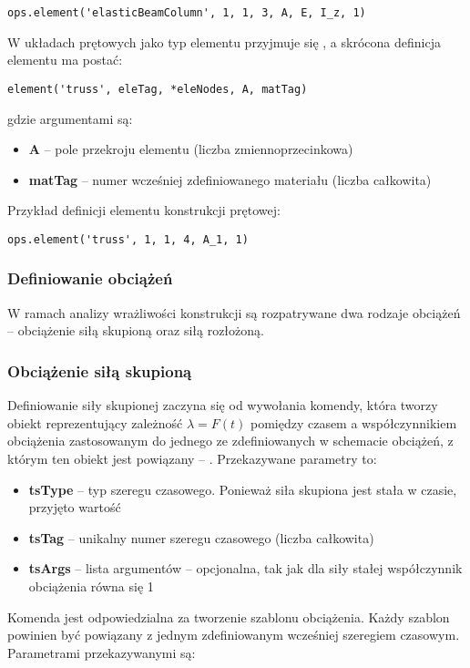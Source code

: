 \begin{lstlisting}
ops.element('elasticBeamColumn', 1, 1, 3, A, E, I_z, 1)
\end{lstlisting}
W układach prętowych jako typ elementu przyjmuje się , a skrócona definicja elementu ma postać:

\begin{lstlisting}
element('truss', eleTag, *eleNodes, A, matTag)
\end{lstlisting}
gdzie argumentami są:
\begin{itemize}
    \item \textbf{A} – pole przekroju elementu (liczba zmiennoprzecinkowa)
    \item \textbf{matTag} – numer wcześniej zdefiniowanego materiału (liczba całkowita)
\end{itemize}
Przykład definicji elementu konstrukcji prętowej:

\begin{lstlisting}
ops.element('truss', 1, 1, 4, A_1, 1)
\end{lstlisting}

\subsubsection{Definiowanie obciążeń}

W ramach analizy wrażliwości konstrukcji są rozpatrywane dwa rodzaje obciążeń – obciążenie siłą skupioną oraz siłą rozłożoną.

\subsubsection*{Obciążenie siłą skupioną}

Definiowanie siły skupionej zaczyna się od wywołania komendy, która tworzy obiekt reprezentujący zależność $\lambda=F(t)$ pomiędzy czasem
a współczynnikiem obciążenia zastosowanym do jednego ze zdefiniowanych w schemacie obciążeń, z którym ten obiekt jest powiązany – .
Przekazywane parametry to:

\begin{itemize}
    \item \textbf{tsType} – typ szeregu czasowego. Ponieważ siła skupiona jest stała w czasie, przyjęto wartość 
    \item \textbf{tsTag} – unikalny numer szeregu czasowego (liczba całkowita)
    \item \textbf{tsArgs} – lista argumentów – opcjonalna, tak jak dla siły stałej współczynnik obciążenia równa się 1
\end{itemize}
Komenda  jest odpowiedzialna za tworzenie szablonu obciążenia.
Każdy szablon powinien być powiązany z jednym zdefiniowanym wcześniej szeregiem czasowym. Parametrami przekazywanymi są:

